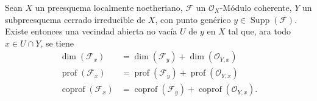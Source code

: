 \begin{proposition}[6.10.6]
\label{IV.2.s6.10.6-fr}
Sean $X$ un preesquema localmente noetheriano, $\mathcal F$ un
$\mathcal O_X$-Módulo coherente, $Y$ un subpreesquema cerrado irreducible de
$X$, con punto genérico $y\in\operatorname{Supp}(\mathcal F)$. Existe
entonces una vecindad abierta no vacía $U$ de $y$ en $X$ tal que, ara todo
$x\in U\cap Y$, se tiene
\begin{align}
\dim(\mathcal F_x)&=\dim(\mathcal F_y)+\dim(\mathcal O_{Y,x})
\tag{6.10.6.1}\label{IV.2.s6.10.6.1-fr}\\
\operatorname{prof}(\mathcal F_x)&=\operatorname{prof}(\mathcal F_y)+
\operatorname{prof}(\mathcal O_{Y,x})
\tag{6.10.6.2}\label{IV.2.s6.10.6.2-fr}\\
\operatorname{coprof}(\mathcal F_x)&=\operatorname{coprof}(\mathcal F_y)+
\operatorname{coprof}(\mathcal O_{Y,x}).
\tag{6.10.6.3}\label{IV.2.s6.10.6.3-fr}
\end{align}
\end{proposition}

